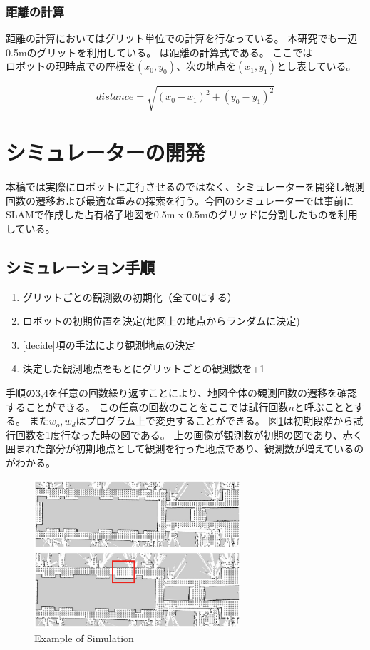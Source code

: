 \documentclass{jsarticle}
\begin{document}
\subsubsection{距離の計算}
距離の計算においてはグリット単位での計算を行なっている。
本研究でも一辺0.5mのグリットを利用している。
は距離の計算式である。
ここでは$ロボットの現時点での座標を(x_0, y_0)、次の地点を(x_1,y_1)$とし表している。


\begin{equation}
  distance = \sqrt{(x_0-x_1)^2 + (y_0-y_1)^2}
	\label{eqn: distance}
\end{equation}



\section{シミュレーターの開発}
\label{simulation}
本稿では実際にロボットに走行させるのではなく、シミュレーターを開発し観測回数の遷移および最適な重みの探索を行う。今回のシミュレーターでは事前にSLAMで作成した占有格子地図を0.5m x 0.5mのグリッドに分割したものを利用している。

\subsection{シミュレーション手順}
\label{process-simulation}
\begin{enumerate}
  \item グリットごとの観測数の初期化（全て0にする）
  \item ロボットの初期位置を決定(地図上の地点からランダムに決定)
  \item \ref{decide}項の手法により観測地点の決定
  \item 決定した観測地点をもとにグリットごとの観測数を+1
\end{enumerate}
手順の3,4を任意の回数繰り返すことにより、地図全体の観測回数の遷移を確認することができる。
この任意の回数のことをここでは試行回数$n$と呼ぶこととする。
また$w_o,w_d$はプログラム上で変更することができる。
図\ref{fig: example of simulation}は初期段階から試行回数を1度行なった時の図である。
上の画像が観測数が初期の図であり、赤く囲まれた部分が初期地点として観測を行った地点であり、観測数が増えているのがわかる。

\begin{figure}[tbh]
 \centering
  \includegraphics[height=55mm]{fig/example.eps}
  \vspace*{-4mm}
  \caption{Example of Simulation}
  \label{fig: example of simulation}
\end{figure}
\end{document}
